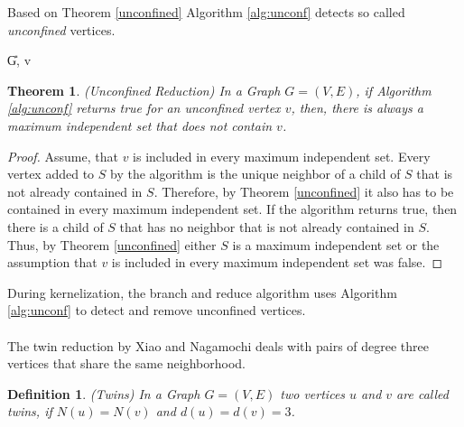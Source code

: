 \documentclass[]{article}
\newtheorem{theorem}{Theorem}
\newtheorem{definition}{Definition}
\begin{document}
Based on Theorem \ref{unconfined} Algorithm \ref{alg:unconf} detects so called \textit{unconfined} vertices.

\begin{algorithm}
	\caption{Unconfined -- Xiao and Nagamochi \cite{XiaoUnconfined}}\label{alg:unconf}
	\DontPrintSemicolon
	
	\U{G, v}	
	
	
\end{algorithm}


\begin{theorem}(Unconfined Reduction) In a Graph $G=(V,E)$, if Algorithm \ref{alg:unconf} returns true for an unconfined vertex $v$, then, there is always a maximum independent set that does not contain $v$.
\end{theorem}
\begin{proof}
	Assume, that $v$ is included in every maximum independent set. Every vertex added to $S$ by the algorithm is the unique neighbor of a child of $S$ that is not already contained in $S$. Therefore, by Theorem \ref{unconfined} it also has to be contained in every maximum independent set. If the algorithm returns true, then there is a child of $S$ that has no neighbor that is not already contained in $S$. Thus, by Theorem \ref{unconfined} either $S$ is a maximum independent set or the assumption that $v$ is included in every maximum independent set was false. 
\end{proof}
During kernelization, the branch and reduce algorithm uses Algorithm \ref{alg:unconf} to detect and remove unconfined vertices.\paragraph{}
The twin reduction by Xiao and Nagamochi \cite{XiaoUnconfined} deals with pairs of degree three vertices that share the same neighborhood.

\begin{definition}(Twins)
	In a Graph $G=(V,E)$ two vertices $u$ and $v$ are called twins, if $N(u) = N(v)$ and $d(u) = d(v) = 3$.
\end{definition}
\end{document}
